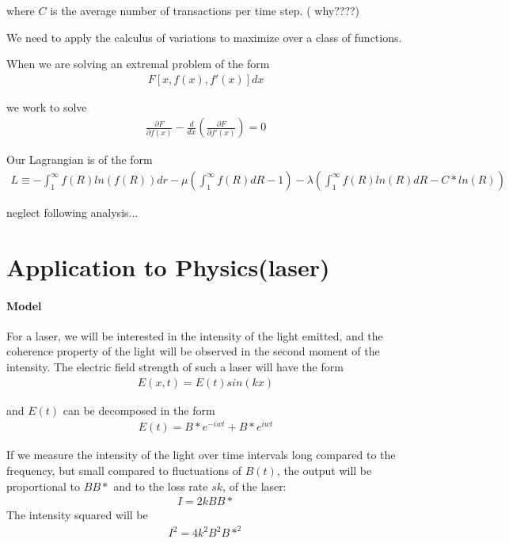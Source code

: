 \documentclass[10 pt,final]{article}
\newcommand{\impo}[1]{{\color{magenta} #1}}
\newcommand{\question}[1]{{\color{blue} #1}}
\begin{document}
where $C$ is the average number of transactions per time step. (\question{why????})

We need to apply the calculus of variations to maximize over a class of functions.

When we are solving an extremal problem of the form
\begin{align*}
F[x,f(x), f'(x)] dx
\end{align*}

we work to solve
\begin{align*}
\frac{\partial F}{\partial f(x)} - \frac{d}{dx}(\frac{\partial F}{\partial f'(x)}) = 0
\end{align*}

Our Lagrangian is of the form
\begin{align*}
L \equiv -\int_1^\infty f(R) ln(f(R)) dr - \mu(\int_1^\infty f(R)dR -1) - \lambda(\int_1^\infty f(R)ln(R)dR - C*ln(R))
\end{align*}

\impo{neglect following analysis...}

\section{Application to Physics(laser)}

\paragraph{Model} For a laser, we will be interested in the intensity of the light emitted, and the coherence property of the light will be observed in the \impo{second moment} of the intensity. The electric field \impo{strength} of such a laser will have the form
\begin{align*}
E(x,t) = E(t)sin(kx)
\end{align*}

and $E(t)$ can be decomposed in the form 
\begin{align*}
E(t) = B*e^{-iwt} + B*e^{iwt}
\end{align*}

If we measure the intensity of the light over time intervals long compared to the frequency, but small compared to fluctuations of $B(t)$, the output will be proportional to $BB*$ and to the \impo{loss rate} $sk$, of the laser:
\begin{align*}
I = 2kBB*
\end{align*}
The \impo{intensity} squared will be
\begin{align*}
I^2 = 4k^2B^2B*^2
\end{align*}
\end{document}
